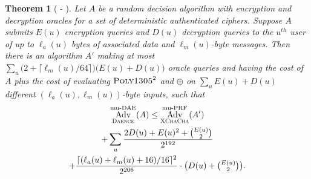 \documentclass[draft]{article}
\newtheorem{theorem}{Theorem}
\def\operatorsc#1{{%
  \ifmmode\let\next=\operatorname\else\let\next=\relax\fi\next{\textsc{#1}}}}
\def\ChaCha#1/{\operatorsc{ChaCha#1}}
\def\XChaCha#1/{\operatorsc{XChaCha#1}}
\def\Poly#1/{\operatorsc{Poly#1}}
\def\Daence/{\operatorsc{Daence}}
\def\muPRF{%
  \ifmmode\def\next{\operatorname{mu-PRF}}%
    \else\def\next/{mu-\textsc{prf}}%
  \fi\next}
\def\muDAE{%
  \ifmmode\def\next{\operatorname{mu-DAE}}%
    \else\def\next/{mu-\textsc{dae}}%
  \fi\next}
\DeclareMathOperator{\Adv}{Adv}
\begin{document}
\begin{theorem}[\ChaCha/-\Daence/]\label{thm-chacha-daence}
  Let $A$ be a random decision algorithm with encryption and
   decryption oracles for a set of deterministic authenticated
   ciphers.
  Suppose $A$ submits $E(u)$ encryption queries and $D(u)$ decryption
   queries to the $u^{\mathit{th}}$ user of up to $\ell_a(u)$ bytes of
   associated data and $\ell_m(u)$-byte messages.
  Then there is an algorithm $A'$ making at most
   $\sum_u \bigl(2 + \lceil\ell_m(u)/64\rceil\bigr)
     \bigl(E(u) + D(u)\bigr)$
   oracle queries and having the cost of $A$ plus the cost of
   evaluating $\Poly1305/^2$ and $\oplus$ on
   $\sum_u E(u) + D(u)$
   different $(\ell_a(u), \ell_m(u))$-byte inputs,
   such that
%
  \begin{multline*}
    \Adv^{\muDAE}_{\Daence/}(A)
     \leq \Adv^{\muPRF}_{\XChaCha/}(A') \\
            + \sum_u
                \frac{2 D(u) + E(u)^2 + \binom{E(u)}{2}}
                     {2^{192}} \\
                + \frac{\lceil(\ell_a(u) + \ell_m(u) + 16)/16\rceil^2}{2^{206}}
                  \cdot
                  {\textstyle\bigl(D(u) + \binom{E(u)}{2}\bigr)}.
  \end{multline*}
\end{theorem}



\end{document}
